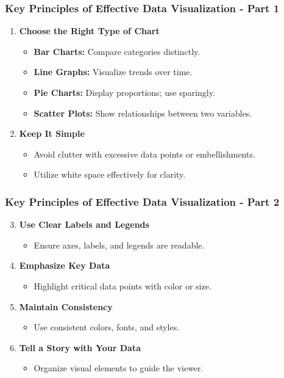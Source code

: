 \documentclass[aspectratio=169]{beamer}
\begin{document}
\begin{frame}[fragile]
    \frametitle{Key Principles of Effective Data Visualization - Part 1}
    \begin{enumerate}
        \item \textbf{Choose the Right Type of Chart}
        \begin{itemize}
            \item \textbf{Bar Charts:} Compare categories distinctly.
            \item \textbf{Line Graphs:} Visualize trends over time.
            \item \textbf{Pie Charts:} Display proportions; use sparingly.
            \item \textbf{Scatter Plots:} Show relationships between two variables.
        \end{itemize}
        
        \item \textbf{Keep It Simple}
        \begin{itemize}
            \item Avoid clutter with excessive data points or embellishments.
            \item Utilize white space effectively for clarity.
        \end{itemize}
    \end{enumerate}
\end{frame}

\begin{frame}[fragile]
    \frametitle{Key Principles of Effective Data Visualization - Part 2}
    \begin{enumerate}
        \setcounter{enumi}{2} %
        \item \textbf{Use Clear Labels and Legends}
        \begin{itemize}
            \item Ensure axes, labels, and legends are readable.
        \end{itemize}

        \item \textbf{Emphasize Key Data}
        \begin{itemize}
            \item Highlight critical data points with color or size.
        \end{itemize}

        \item \textbf{Maintain Consistency}
        \begin{itemize}
            \item Use consistent colors, fonts, and styles.
        \end{itemize}

        \item \textbf{Tell a Story with Your Data}
        \begin{itemize}
            \item Organize visual elements to guide the viewer.
        \end{itemize}
    \end{enumerate}
\end{frame}
\end{document}

